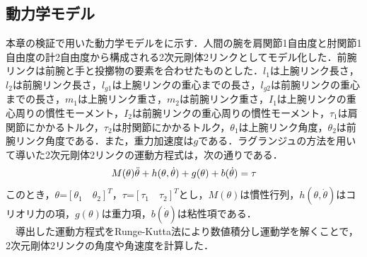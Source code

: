 \begin{small}
\subsection{動力学モデル}
本章の検証で用いた動力学モデルをに示す．人間の腕を肩関節1自由度と肘関節1自由度の計2自由度から構成される2次元剛体2リンクとしてモデル化した．前腕リンクは前腕と手と投擲物の要素を合わせたものとした．$l_{1}$は上腕リンク長さ，$l_{2}$は前腕リンク長さ，$l_{g1}$は上腕リンクの重心までの長さ，$l_{g2}$は前腕リンクの重心までの長さ，$m_{1}$は上腕リンク重さ，$m_{2}$は前腕リンク重さ，$I_{1}$は上腕リンクの重心周りの慣性モーメント，$I_{2}$は前腕リンクの重心周りの慣性モーメント，$\tau_{1}$は肩関節にかかるトルク，$\tau_{2}$は肘関節にかかるトルク，$\theta_{1}$は上腕リンク角度，$\theta_{2}$は前腕リンク角度である．また，重力加速度は$g$である．ラグランジュの方法を用いて導いた2次元剛体2リンクの運動方程式は，次の通りである．
\begin{eqnarray}
  \equlabel{5}
  M(\theta)\ddot{\theta} + h(\theta, \dot{\theta}) + g(\theta) + b(\dot{\theta}) = \tau
\end{eqnarray}
このとき，$\theta$=${[\theta_{1} \quad \theta_{2}]}^T$，$\tau$=${[\tau_{1} \quad \tau_{2}]}^T$とし，$M(\theta)$は慣性行列，$h(\theta, \dot{\theta})$はコリオリ力の項，$g(\theta)$は重力項，$b(\dot{\theta})$は粘性項である．\\
　導出した運動方程式をRunge-Kutta法\cite{runge-kutta}により数値積分し運動学を解くことで，2次元剛体2リンクの角度や角速度を計算した．

\end{small}
